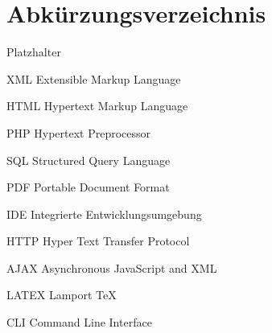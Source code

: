 \chapter{Abkürzungsverzeichnis}
%
\begin{bfscript}{Platzhalter}
\item[XML] Extensible Markup Language
\item[HTML] Hypertext Markup Language
\item[PHP] Hypertext Preprocessor
\item[SQL] Structured Query Language
\item[PDF] Portable Document Format
\item[IDE] Integrierte Entwicklungsumgebung
\item[HTTP] Hyper Text Transfer Protocol
\item[AJAX] Asynchronous JavaScript and XML
\item[LATEX] Lamport TeX
\item[CLI] Command Line Interface
\end{bfscript}
%